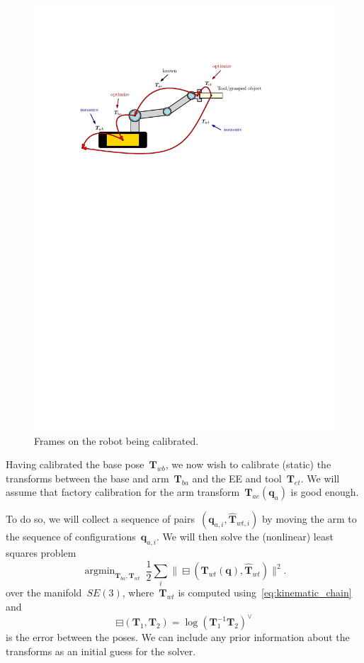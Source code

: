 \documentclass{article}
\DeclareMathOperator*{\argmin}{argmin}
\begin{document}
\begin{figure}[h]
  \centering
  \includegraphics[width=1\textwidth]{figures/robot_calibration.pdf}
  \caption{Frames on the robot being calibrated.}
    \label{fig:calibration}
\end{figure}

Having calibrated the base pose~$\bm{T}_{wb}$, we now wish to calibrate
(static) the transforms between the base and arm~$\bm{T}_{ba}$ and the EE and
tool~$\bm{T}_{et}$. We will assume that factory calibration for the arm
transform~$\bm{T}_{ae}(\bm{q}_a)$ is good enough.

To do so, we will collect a sequence of
pairs~$(\bm{q}_{a,i},\hat{\bm{T}}_{wt,i})$ by moving the arm to the sequence of
configurations~$\bm{q}_{a,i}$. We will then solve the (nonlinear) least squares
problem
\begin{equation}
  \argmin_{\bm{T}_{ba},\bm{T}_{wt}}\ \frac{1}{2}\sum_i\|\boxminus(\bm{T}_{wt}(\bm{q}),\hat{\bm{T}}_{wt})\|^2.
\end{equation}
over the manifold~$SE(3)$, where~$\bm{T}_{wt}$ is computed using~\eqref{eq:kinematic_chain} and
\begin{equation}
  \boxminus(\bm{T}_1,\bm{T}_2) = \log(\bm{T}_1^{-1}\bm{T}_2)^\vee
\end{equation}
is the error between the poses. We can include any prior information about the
transforms as an initial guess for the solver.
\end{document}
